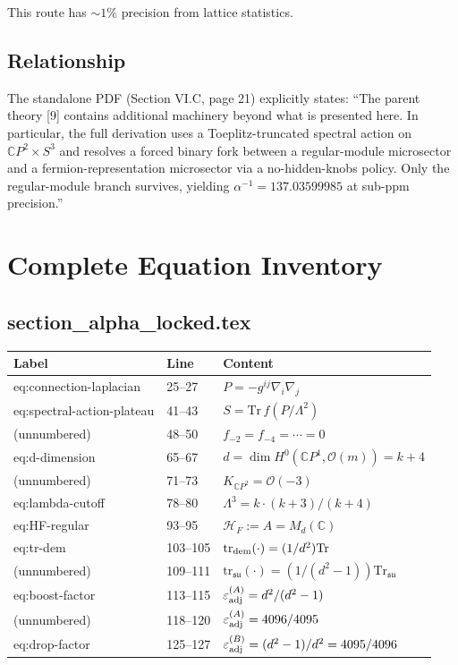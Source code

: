 \documentclass[12pt,a4paper]{article}
\begin{document}
This route has $\sim 1\%$ precision from lattice statistics.

\subsection{Relationship}

The standalone PDF (Section VI.C, page 21) explicitly states:
``The parent theory [9] contains additional machinery beyond what is
presented here.  In particular, the full derivation uses a
Toeplitz-truncated spectral action on $\mathbb{C}P^2 \times S^3$ and
resolves a forced binary fork between a regular-module microsector and
a fermion-representation microsector via a no-hidden-knobs policy.
Only the regular-module branch survives, yielding
$\alpha^{-1} = 137.03599985$ at sub-ppm precision.''

\section{Complete Equation Inventory}
\label{sec:equations}

\subsection{section\_alpha\_locked.tex}

\begin{longtable}{p{}p{}p{}}
\toprule
\textbf{Label} & \textbf{Line} & \textbf{Content} \\
\midrule
eq:connection-laplacian & 25--27 & $P = -g^{ij}\nabla_i\nabla_j$ \\
eq:spectral-action-plateau & 41--43 & $S = \mathrm{Tr}\,f(P/\Lambda^2)$ \\
(unnumbered) & 48--50 & $f_{-2} = f_{-4} = \cdots = 0$ \\
eq:d-dimension & 65--67 & $d = \dim H^0(\mathbb{C}P^1, \mathcal{O}(m)) = k + 4$ \\
(unnumbered) & 71--73 & $K_{\mathbb{C}P^2} = \mathcal{O}(-3)$ \\
eq:lambda-cutoff & 78--80 & $\Lambda^3 = k \cdot (k+3)/(k+4)$ \\
eq:HF-regular & 93--95 & $\mathcal{H}_F := A = M_d(\mathbb{C})$ \\
eq:tr-dem & 103--105 & $\mathrm{tr}_{\rm dem}(\cdot) = (1/d^2)\mathrm{Tr}$ \\
(unnumbered) & 109--111 & $\mathrm{tr}_{\mathfrak{su}}(\cdot) = (1/(d^2-1))\mathrm{Tr}_{\mathfrak{su}}$ \\
eq:boost-factor & 113--115 & $\varepsilon_{\rm adj}^{(A)} = d^2/(d^2-1)$ \\
(unnumbered) & 118--120 & $\varepsilon_{\rm adj}^{(A)} = 4096/4095$ \\
eq:drop-factor & 125--127 & $\varepsilon_{\rm adj}^{(B)} = (d^2-1)/d^2 = 4095/4096$ \\
\bottomrule
\end{longtable}
\end{document}
